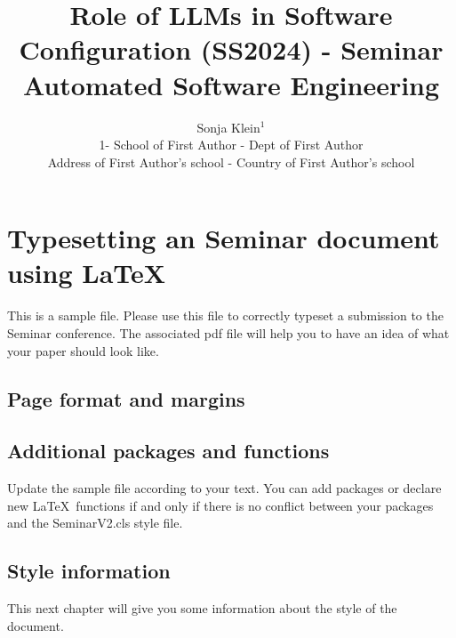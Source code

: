 \documentclass{SeminarV2}
\begin{document}
\title{Role of LLMs in Software Configuration (SS2024) - Seminar Automated Software Engineering}

\author{Sonja Klein$^1$
%
\vspace{.3cm}\\
%
1- School of First Author - Dept of First Author \\
Address of First Author's school - Country of First Author's
school
}

\maketitle

\begin{abstract}

\end{abstract}

\section{Typesetting an Seminar document using \LaTeX}

This is a sample file. Please use this file to correctly typeset a
submission to the Seminar conference. The associated pdf file will
help you to have an idea of what your paper should look like.

\subsection{Page format and margins}


\subsection{Additional packages and functions}
Update the sample file according to your text. You can add
packages or declare new \LaTeX\ functions if and only if there is no conflict between your packages and the SeminarV2.cls style file.

\subsection{Style information}
This next chapter will give you some information about the style of the document.
\end{document}
